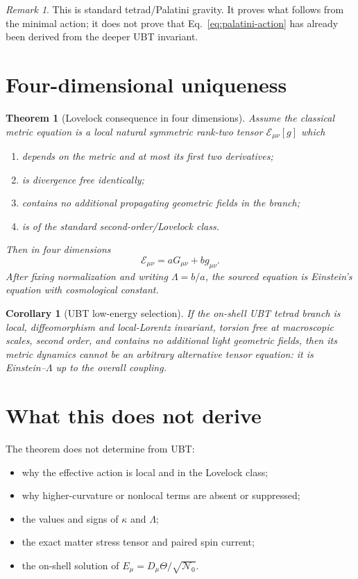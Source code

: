 \documentclass[12pt,a4paper]{article}
\newtheorem{theorem}[definition]{Theorem}
\newtheorem{corollary}[definition]{Corollary}
\theoremstyle{remark}\newtheorem{remark}[definition]{Remark}
\begin{document}
\begin{remark}
This is standard tetrad/Palatini gravity.  It proves what follows from the
minimal action; it does not prove that Eq.~\eqref{eq:palatini-action} has
already been derived from the deeper UBT invariant.
\end{remark}

\section{Four-dimensional uniqueness}
\begin{theorem}[Lovelock consequence in four dimensions]
Assume the classical metric equation is a local natural symmetric rank-two
tensor $\mathcal E_{\mu\nu}[g]$ which
\begin{enumerate}
 \item depends on the metric and at most its first two derivatives;
 \item is divergence free identically;
 \item contains no additional propagating geometric fields in the branch;
 \item is of the standard second-order/Lovelock class.
\end{enumerate}
Then in four dimensions
\begin{equation}
 \boxed{\mathcal E_{\mu\nu}=aG_{\mu\nu}+bg_{\mu\nu}.}
 \label{eq:lovelock-form}
\end{equation}
After fixing normalization and writing $\Lambda=b/a$, the sourced equation is
Einstein's equation with cosmological constant.
\end{theorem}

\begin{corollary}[UBT low-energy selection]
If the on-shell UBT tetrad branch is local, diffeomorphism and local-Lorentz
invariant, torsion free at macroscopic scales, second order, and contains no
additional light geometric fields, then its metric dynamics cannot be an
arbitrary alternative tensor equation: it is Einstein--$\Lambda$ up to the
overall coupling.
\end{corollary}

\section{What this does not derive}
The theorem does not determine from UBT:
\begin{itemize}
 \item why the effective action is local and in the Lovelock class;
 \item why higher-curvature or nonlocal terms are absent or suppressed;
 \item the values and signs of $\kappa$ and $\Lambda$;
 \item the exact matter stress tensor and paired spin current;
 \item the on-shell solution of $E_\mu=D_\mu\Theta/\sqrt{\mathcal N_0}$.
\end{itemize}
\end{document}
